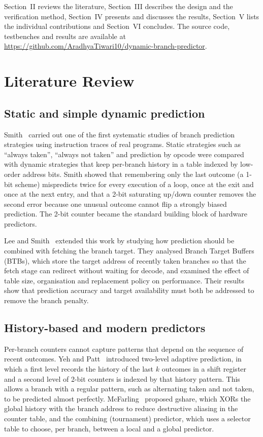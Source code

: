 \documentclass[conference]{IEEEtran}
\begin{document}
Section~II reviews the literature, Section~III describes the design and the verification
method, Section~IV presents and discusses the results, Section~V lists the individual
contributions and Section~VI concludes.
The source code, testbenches and results are available at
\url{https://github.com/AradhyaTiwari10/dynamic-branch-predictor}.

\section{Literature Review}
\subsection{Static and simple dynamic prediction}
Smith~\cite{smith1981} carried out one of the first systematic studies of branch prediction
strategies using instruction traces of real programs. Static strategies such as ``always
taken'', ``always not taken'' and prediction by opcode were compared with dynamic strategies
that keep per-branch history in a table indexed by low-order address bits. Smith showed that
remembering only the last outcome (a 1-bit scheme) mispredicts twice for every execution of a
loop, once at the exit and once at the next entry, and that a 2-bit saturating up/down counter
removes the second error because one unusual outcome cannot flip a strongly biased prediction.
The 2-bit counter became the standard building block of hardware predictors.

Lee and Smith~\cite{lee1984} extended this work by studying how prediction should be combined
with fetching the branch target. They analysed Branch Target Buffers (BTBs), which store the
target address of recently taken branches so that the fetch stage can redirect without waiting
for decode, and examined the effect of table size, organisation and replacement policy on
performance. Their results show that prediction accuracy and target availability must both be
addressed to remove the branch penalty.

\subsection{History-based and modern predictors}
Per-branch counters cannot capture patterns that depend on the sequence of recent outcomes.
Yeh and Patt~\cite{yeh1991} introduced two-level adaptive prediction, in which a first level
records the history of the last $k$ outcomes in a shift register and a second level of 2-bit
counters is indexed by that history pattern. This allows a branch with a regular pattern, such
as alternating taken and not taken, to be predicted almost perfectly.
McFarling~\cite{mcfarling1993} proposed gshare, which XORs the global history with the branch
address to reduce destructive aliasing in the counter table, and the combining (tournament)
predictor, which uses a selector table to choose, per branch, between a local and a global
predictor.
\end{document}

